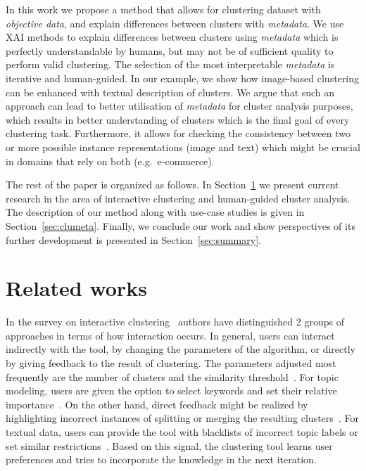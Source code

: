 \documentclass{article}
\begin{document}
In this work we propose a method that allows for clustering dataset with \textit{objective data}, and explain differences between clusters with \textit{metadata}.
We use XAI methods to explain differences between clusters using \textit{metadata} which is perfectly understandable by humans, but may not be of sufficient quality to perform valid clustering.
The selection of the most interpretable \textit{metadata} is iterative and human-guided.
In our example, we show how image-based clustering can be enhanced with textual description of clusters.
We argue that such an approach can lead to better utilisation of \textit{metadata} for cluster analysis purposes, which results in better understanding of clusters which is the final goal of every clustering task. %
Furthermore, it allows for checking the consistency between two or more possible instance representations (image and text) which might be crucial in domains that rely on both (e.g.\ e-commerce).

The rest of the paper is organized as follows.
In Section~\ref{sec:sota} we present current research in the area of interactive clustering and human-guided cluster analysis.
The description of our method along with use-case studies is given in Section~\ref{sec:clumeta}.
Finally, we conclude our work and show perspectives of its further development is presented in Section~\ref{sec:summary}.

\section{Related works}
\label{sec:sota}

In the survey on interactive clustering~\cite{10.1145/3340960} authors have distinguished 2 groups of approaches in terms of how interaction occurs.
In general, users can interact indirectly with the tool, by changing the parameters of the algorithm, or directly by giving feedback to the result of clustering.
The parameters adjusted most frequently are the number of clusters and the similarity threshold~\cite{10.1007/978-3-319-23461-8_43,10.1016/j.eswa.2017.11.055}.
For topic modeling, users are given the option to select keywords and set their relative importance~\cite{ElAssady2018ProgressiveLO}. %
On the other hand, direct feedback might be realized by highlighting incorrect instances of splitting or merging the resulting clusters~\cite{10.1155/2017/4915828}. %
For textual data, users can provide the tool with blacklists of incorrect topic labels or set similar restrictions~\cite{Chang2016AppGrouperKI}. %
Based on this signal, the clustering tool learns user preferences and tries to incorporate the knowledge in the next iteration.
\end{document}
